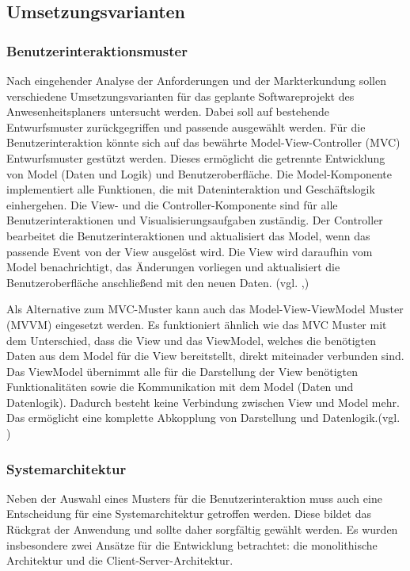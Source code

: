 \subsection{Umsetzungsvarianten}
\label{sec:Umsetzungsvarianten}


\subsubsection{Benutzerinteraktionsmuster}
\label{sec:Benutzerinteraktionsmuster}
Nach eingehender Analyse der Anforderungen und der Markterkundung sollen verschiedene Umsetzungsvarianten für das geplante Softwareprojekt des Anwesenheitsplaners untersucht werden. Dabei soll auf bestehende Entwurfsmuster zurückgegriffen und passende ausgewählt werden. Für die Benutzerinteraktion könnte sich auf das bewährte Model-View-Controller (MVC) Entwurfsmuster gestützt werden. Dieses ermöglicht die getrennte Entwicklung von Model (Daten und Logik) und Benutzeroberfläche. Die Model-Komponente implementiert alle Funktionen, die mit Dateninteraktion und Geschäftslogik einhergehen. Die View- und die Controller-Komponente sind für alle Benutzerinteraktionen und Visualisierungsaufgaben zuständig. Der Controller bearbeitet die Benutzerinteraktionen und aktualisiert das Model, wenn das passende Event von der View ausgelöst wird. Die View wird daraufhin vom Model benachrichtigt, das Änderungen vorliegen und aktualisiert die Benutzeroberfläche anschließend mit den neuen Daten. (vgl. \cite[S. 847 - 857]{goll2011},\cite{MVC})

Als Alternative zum MVC-Muster kann auch das Model-View-ViewModel Muster (MVVM) eingesetzt werden. Es funktioniert ähnlich wie das MVC Muster mit dem Unterschied, dass die View und das ViewModel, welches die benötigten Daten aus dem Model für die View bereitstellt, direkt miteinader verbunden sind. Das ViewModel übernimmt alle für die Darstellung der View benötigten Funktionalitäten sowie die Kommunikation mit dem Model (Daten und Datenlogik). Dadurch besteht keine Verbindung zwischen View und Model mehr. Das ermöglicht eine komplette Abkopplung von Darstellung und Datenlogik.(vgl. \cite{MVVM})

\subsubsection{Systemarchitektur}
\label{sec:Systemarchitektur}
Neben der Auswahl eines Musters für die Benutzerinteraktion muss auch eine Entscheidung für eine Systemarchitektur getroffen werden. Diese bildet das Rückgrat der Anwendung und sollte daher sorgfältig gewählt werden. Es wurden insbesondere zwei Ansätze für die Entwicklung betrachtet: die monolithische Architektur und die Client-Server-Architektur.

